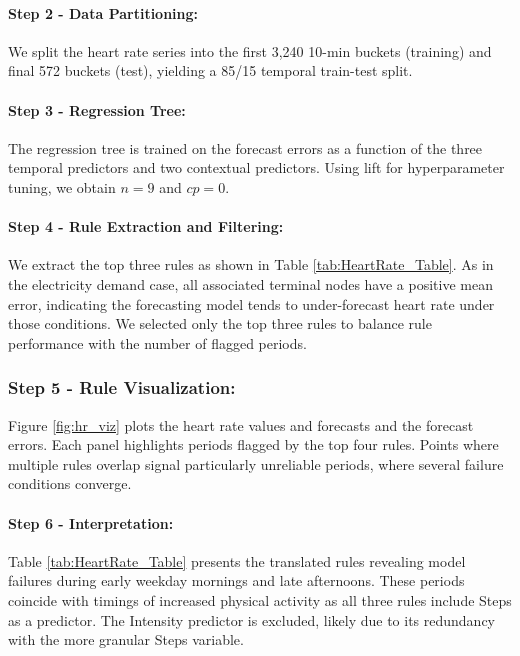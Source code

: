 \documentclass[12pt]{article}
\begin{document}
\paragraph{Step 2 - Data Partitioning:}
We split the heart rate series into the first 3,240 10-min buckets (training) and final 572 buckets (test), yielding a 85/15 temporal train-test split.

\paragraph{Step 3 - Regression Tree:}
The regression tree is trained on the forecast errors as a function of the three temporal predictors and two contextual predictors. Using lift for hyperparameter tuning, we obtain  $n = 9$ and $cp = 0$.

\paragraph{Step 4 - Rule Extraction and Filtering:}
We extract the top three rules as shown in Table \ref{tab:HeartRate_Table}. As in the electricity demand case, all associated terminal nodes have a positive mean error, indicating the forecasting model tends to under-forecast heart rate under those conditions. We selected only the top three rules to balance rule performance with the number of flagged periods. %

\subsubsection*{Step 5 - Rule Visualization:}
Figure \ref{fig:hr_viz} plots the heart rate values and forecasts and the forecast errors. Each panel highlights periods flagged by the top four rules. Points where multiple rules overlap signal particularly unreliable periods, where several failure conditions converge.

\paragraph{Step 6 - Interpretation:}
Table \ref{tab:HeartRate_Table} presents the translated rules revealing model failures during early weekday mornings and late afternoons. These  periods coincide with timings of increased physical activity as all three rules include Steps as a predictor. The Intensity predictor is excluded, likely due to its redundancy with the more granular Steps variable.
\end{document}

